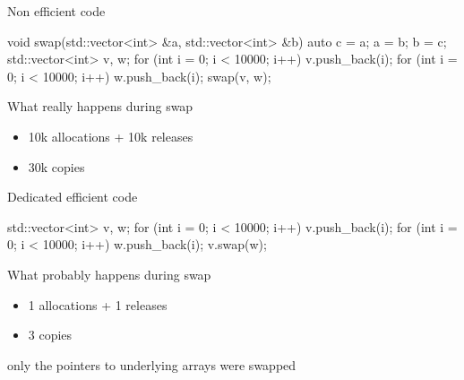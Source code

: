 \begin{frame}[fragile]
  \begin{exampleblock}{Non efficient code}
    \begin{cppcode*}{}
      void swap(std::vector<int> &a,
                std::vector<int> &b) {
        auto c = a;
        a = b;
        b = c;
      }
      std::vector<int> v, w;
      for (int i = 0; i < 10000; i++) v.push_back(i);
      for (int i = 0; i < 10000; i++) w.push_back(i);
      swap(v, w);
    \end{cppcode*}
  \end{exampleblock}
  \pause
  \begin{alertblock}{What really happens during swap}
    \begin{itemize}
    \item 10k allocations + 10k releases
    \item 30k copies
    \end{itemize}
  \end{alertblock}
\end{frame}

\begin{frame}[fragile]
  \begin{exampleblock}{Dedicated efficient code}
    \begin{cppcode*}{}
      std::vector<int> v, w;
      for (int i = 0; i < 10000; i++) v.push_back(i);
      for (int i = 0; i < 10000; i++) w.push_back(i);
      v.swap(w);
      \end{cppcode*}
  \end{exampleblock}
  \pause
  \begin{block}{What probably happens during swap}
    \begin{itemize}
    \item 1 allocations + 1 releases
    \item 3 copies
    \end{itemize}
    only the pointers to underlying arrays were swapped
  \end{block}
\end{frame}

